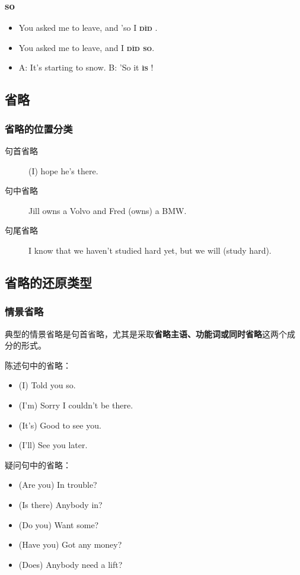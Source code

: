 \subsubsection{so}
\begin{itemize}
\item You asked me to leave, and 'so I  \textbf{\textsc{d\`id}} .
\item You asked me to leave, and  I \textbf{\textsc{d\`id so}}.
\item A: It's starting to snow. B: 'So it \textbf{\textsc{\`is}} !
\end{itemize}

\subsection{省略}

\subsubsection{省略的位置分类}

\begin{description}
\item[句首省略] (I) hope he's there.
\item[句中省略] Jill owns a Volvo and Fred (owns) a BMW.
\item[句尾省略] I know that we haven't studied hard yet, but we will (study hard).
\end{description}

\subsection{省略的还原类型}

\subsubsection{情景省略}

典型的情景省略是句首省略，尤其是采取\textbf{省略主语、功能词或同时省略}这两个成
分的形式。

陈述句中的省略：
\begin{itemize}
\item (I) Told you so.
\item (I'm) Sorry I couldn't be there.
\item (It's) Good to see you.
\item (I'll) See you later.
\end{itemize}

疑问句中的省略：
\begin{itemize}
\item (Are you) In trouble?
\item (Is there) Anybody in?
\item (Do you) Want some?
\item (Have you) Got any money?
\item (Does) Anybody need a lift?
\end{itemize}

